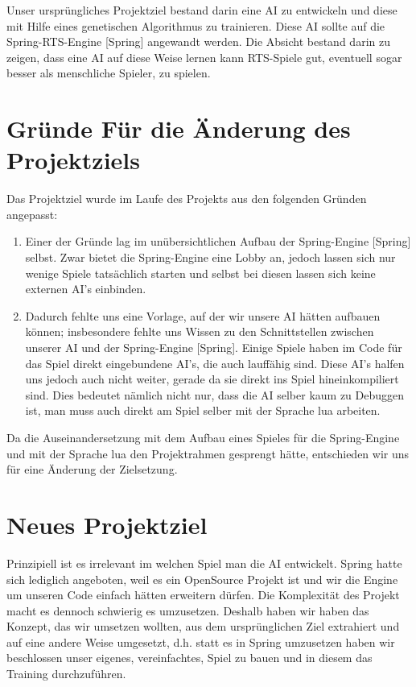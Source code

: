 \documentclass[
	12pt,
	a4paper,
	BCOR10mm,
	DIV14,
	headsepline,
	usegeometry,
]{scrreprt}
\begin{document}
Unser ursprüngliches Projektziel bestand darin eine AI zu entwickeln und diese mit Hilfe eines genetischen Algorithmus zu trainieren. Diese AI sollte auf die Spring-RTS-Engine [Spring] angewandt werden. Die Absicht bestand darin zu zeigen, dass eine AI auf diese Weise lernen kann RTS-Spiele gut, eventuell sogar besser als menschliche Spieler, zu spielen.\\

\section{Gründe Für die Änderung des Projektziels}

Das Projektziel wurde im Laufe des Projekts aus den folgenden Gründen angepasst:
\begin{enumerate}
	\item Einer der Gründe lag im unübersichtlichen Aufbau der Spring-Engine [Spring] selbst. 
		Zwar bietet die Spring-Engine eine Lobby an, jedoch lassen sich nur wenige Spiele tatsächlich starten und selbst bei diesen lassen sich keine externen AI's einbinden. 

	\item	Dadurch fehlte uns eine Vorlage, auf der wir unsere AI hätten aufbauen können; insbesondere fehlte uns Wissen zu den Schnittstellen zwischen unserer AI und der Spring-Engine [Spring].
		Einige Spiele haben im Code für das Spiel direkt eingebundene AI's, die auch lauffähig sind. 
		Diese AI's halfen uns jedoch auch nicht weiter, gerade da sie direkt ins Spiel hineinkompiliert sind. 
		Dies bedeutet nämlich nicht nur, dass die AI selber kaum zu Debuggen ist, man muss auch direkt am Spiel selber mit der Sprache lua arbeiten. 
\end{enumerate}

Da die Auseinandersetzung mit dem Aufbau eines Spieles für die Spring-Engine und mit der Sprache lua den Projektrahmen gesprengt hätte, entschieden wir uns für eine Änderung der Zielsetzung.

\section{Neues Projektziel}
Prinzipiell ist es irrelevant im welchen Spiel man die AI entwickelt. Spring hatte sich lediglich angeboten, weil es ein OpenSource Projekt ist und wir die Engine um unseren Code einfach hätten erweitern dürfen.
Die Komplexität des Projekt macht es dennoch schwierig es umzusetzen.
Deshalb haben wir haben das Konzept, das wir umsetzen wollten, aus dem ursprünglichen Ziel extrahiert und auf eine andere Weise umgesetzt, d.h. statt es in Spring umzusetzen haben wir beschlossen unser eigenes, vereinfachtes, Spiel zu bauen und in diesem das Training durchzuführen.
\end{document}
